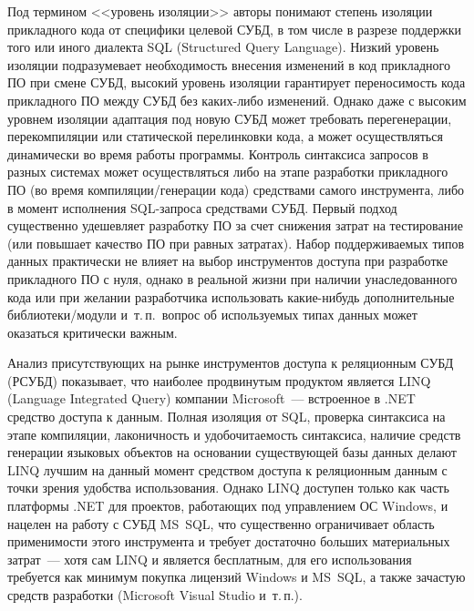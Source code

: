 \begin{multicols}{2}

Под термином <<уровень изоляции>> авторы понимают степень изоляции прикладного 
кода от специфики целевой СУБД, в том числе в разрезе поддержки того или иного 
диалекта SQL (Structured Query Language). Низкий уровень изоляции подразумевает необходимость внесения 
изменений в код прикладного ПО при смене СУБД, высокий уровень изоляции 
гарантирует переносимость кода прикладного ПО между СУБД без каких-либо 
изменений. Однако даже с высоким уровнем изоляции адаптация под новую СУБД может 
требовать перегенерации, перекомпиляции или статической перелинковки кода, а может 
осуществляться динамически во время работы программы. Контроль синтаксиса запросов 
в разных системах может осуществляться либо на этапе разработки прикладного ПО (во 
время компиляции/генерации кода) средствами самого инструмента, либо в момент 
исполнения SQL-за\-про\-са средствами СУБД. Первый подход существенно удешевляет 
разработку ПО за счет снижения затрат на тестирование (или повышает качество ПО при 
равных затратах). Набор поддерживаемых типов данных практически не влияет на выбор 
инструментов доступа при разработке прикладного ПО с нуля, однако в реальной жизни 
при наличии унаследованного кода или при желании разработчика использовать 
ка\-кие-ни\-будь дополнительные биб\-лио\-те\-ки/мо\-ду\-ли и~т.\,п.\ вопрос об используемых 
типах данных может оказаться критически важным. 

Анализ присутствующих на рынке инструментов доступа к 
реляционным СУБД (РСУБД) показывает, что 
наиболее продвинутым продуктом является LINQ (Language Integrated Query) компании 
Microsoft~--- встроенное в .NET средство доступа к данным. Полная изоляция от SQL, 
проверка синтаксиса на этапе компиляции, лаконичность и удобочитаемость синтаксиса, 
наличие средств генерации языковых объектов на основании существующей базы данных 
делают LINQ лучшим на данный момент средством доступа к реляционным данным с 
точки зрения удобства использования. Однако LINQ доступен только как часть 
платформы .NET для проектов, работающих под управлением ОС Windows, и нацелен на 
работу с СУБД MS~SQL, что существенно ограничивает область применимости этого 
инструмента и требует достаточно больших материальных затрат~--- хотя сам LINQ и 
является бесплатным, для его использования требуется как минимум покупка лицензий 
Windows и MS~SQL, а также зачастую средств разработки (Microsoft Visual Studio и~т.\,п.).


\end{multicols}
